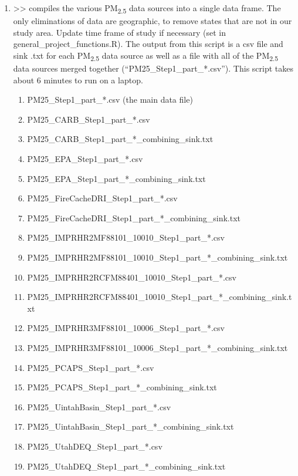 \begin{enumerate}[nolistsep]
\item {} >> compiles the various PM\textsubscript{2.5} data sources into a single data frame. The only eliminations of data are geographic, to remove states that are not in our study area. Update time frame of study if necessary (set in general\_project\_functions.R). The output from this script is a csv file and sink .txt for each  PM\textsubscript{2.5} data source as well as a file with all of the PM\textsubscript{2.5} data sources merged together (``PM25\_Step1\_part\_*.csv''). This script takes about 6 minutes to run on a laptop. %
\begin{enumerate}[nolistsep]
\item PM25\_Step1\_part\_*.csv (the main data file)
\item PM25\_CARB\_Step1\_part\_*.csv
\item PM25\_CARB\_Step1\_part\_*\_combining\_sink.txt
\item PM25\_EPA\_Step1\_part\_*.csv
\item PM25\_EPA\_Step1\_part\_*\_combining\_sink.txt
\item PM25\_FireCacheDRI\_Step1\_part\_*.csv
\item PM25\_FireCacheDRI\_Step1\_part\_*\_combining\_sink.txt
\item PM25\_IMPRHR2MF88101\_10010\_Step1\_part\_*.csv
\item PM25\_IMPRHR2MF88101\_10010\_Step1\_part\_*\_combining\_sink.txt
\item PM25\_IMPRHR2RCFM88401\_10010\_Step1\_part\_*.csv
\item PM25\_IMPRHR2RCFM88401\_10010\_Step1\_part\_*\_combining\_sink.txt
\item PM25\_IMPRHR3MF88101\_10006\_Step1\_part\_*.csv
\item PM25\_IMPRHR3MF88101\_10006\_Step1\_part\_*\_combining\_sink.txt
\item PM25\_PCAPS\_Step1\_part\_*.csv
\item PM25\_PCAPS\_Step1\_part\_*\_combining\_sink.txt
\item PM25\_UintahBasin\_Step1\_part\_*.csv
\item PM25\_UintahBasin\_Step1\_part\_*\_combining\_sink.txt
\item PM25\_UtahDEQ\_Step1\_part\_*.csv
\item PM25\_UtahDEQ\_Step1\_part\_*\_combining\_sink.txt
\end{enumerate}

\end{enumerate}
